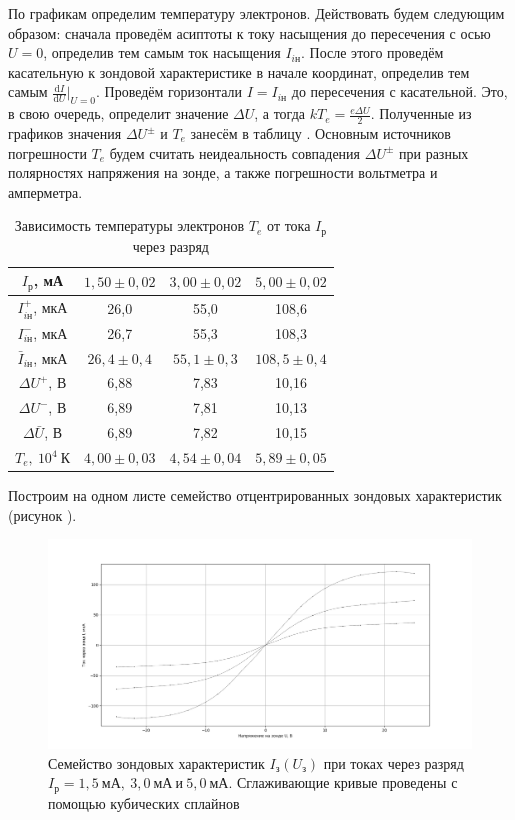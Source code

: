 \documentclass[a4paper,10pt]{article}
\begin{document}
По графикам определим температуру электронов. Действовать будем следующим образом: сначала проведём асиптоты к току насыщения до пересечения с осью $U=0$, определив тем самым ток насыщения $I_{i\text{н}}$. После этого проведём касательную к зондовой характеристике в начале координат, определив тем самым $\frac{\text{d}I}{\text{d}U}\vert_{U=0}$. Проведём горизонтали $I=I_{i\text{н}}$ до пересечения с касательной. Это, в свою очередь, определит значение $\Delta U$, а тогда $kT_e=\frac{e\Delta U}{2}$. Полученные из графиков значения $\Delta U^{\pm}$ и $T_e$ занесём в таблицу . Основным источников погрешности $T_e$ будем считать неидеальность совпадения $\Delta U^{\pm}$ при разных полярностях напряжения на зонде, а также погрешности вольтметра и амперметра.

\begin{table}[h]
	\centering
	\caption{Зависимость температуры электронов $T_e$ от тока $I_{\text{р}}$ через разряд} \label{scr}
	\begin{tabular}{|c|c|c|c|}
		\hline
		$I_{\text{р}}$, мА & $1,50\pm0,02$ & $3,00\pm0,02$ & $5,00\pm0,02$ \\ \hline
		$I_{i\text{н}}^+$, мкА & 26,0 & 55,0 & 108,6 \\ \hline
		$I_{i\text{н}}^-$, мкА & 26,7 & 55,3 & 108,3 \\ \hline
		$\bar{I}_{i\text{н}}$, мкА & $26,4\pm0,4$ & $55,1\pm0,3$ & $108,5\pm0,4$ \\ \hline
		$\Delta U^+$, В & 6,88 & 7,83 & 10,16 \\ \hline
		$\Delta U^-$, В & 6,89 & 7,81 & 10,13 \\ \hline
		$\Delta\bar{U}$, В & 6,89 & 7,82 & 10,15 \\ \hline
		$T_e,\ 10^4~\text{К}$ & $4,00\pm0,03$ & $4,54\pm0,04$ & $5,89\pm0,05$ \\ \hline
	\end{tabular}
\end{table}

Построим на одном листе семейство отцентрированных зондовых характеристик (рисунок ).

\begin{figure}[h]
	\centering
	\includegraphics[scale=0.30]{zoondz}
	\caption{Семейство зондовых характеристик $I_{\text{з}}\left(U_{\text{з}}\right)$ при токах через разряд $I_{\text{р}}=1,5~\text{мА},\ 3,0~\text{мА}\ \text{и}\ 5,0~\text{мА}$. Сглаживающие кривые проведены с помощью кубических сплайнов} \label{zoondz}
\end{figure}
\end{document}
